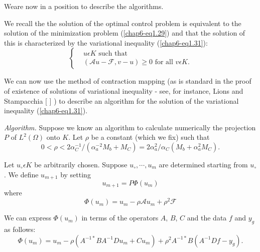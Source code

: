 We\pageoriginale are now in a position to describe the algorithms.

\medskip 
{} We recall the the solution
of the optimal control problem is equivalent to the solution of the
minimization problem (\ref{chap6-eq1.29}) and that the solution of
this is characterized by the variational inequality
(\ref{chap6-eq1.31}): 
\begin{equation*}
\begin{cases}
& u \epsilon K \text{ such that }\\
& (\mathscr{A} u - \mathscr{F}, v - u) \geq 0 \text{ for all } v \epsilon K.
\end{cases}
\end{equation*}

We can now use the method of contraction mapping (as is standard in
the proof of existence of solutions of variational inequality - see,
for instance, Lions and Stampacchia [ ] ) to describe an algorithm for
the solution of the variational inequality (\ref{chap6-eq1.31}). 

{\em Algorithm.} Suppose we know an algorithm to calculate numerically
the projection $P$ of $L^{2} (\Omega)$ onto $K$. Let $\rho$ be a constant
(which we fix) such that 
\begin{equation*}
0 < \rho < 2\alpha_{C}^{-1} / (\alpha_{a}^{-2} M_{b} + M_{C}) = 2\alpha_{a}^{2} / \alpha_{C} (M_{b} + \alpha_{a}^{2} M_{C}).\tag{1.38}\label{chap6-eq1.38}
\end{equation*}

Let $u_{\circ} \epsilon K$ be arbitrarily chosen. Suppose $u_{\circ},
\cdots , u_{m}$ are determined starting from $u_{\circ}$. We define
$u_{m+1}$ by setting 
\begin{equation*}
u_{m+1} = P \Phi (u_{m})\tag{1.39}\label{chap6-eq1.39}
\end{equation*}
where
\begin{equation*}
\Phi (u_{m}) = u_{m} - \rho \mathscr{A}u_{m} + \rho^{2}
\mathscr{F}\tag*{$(1.39)'$}\label{chap6-eq1.39'} 
\end{equation*}

We can express $\Phi (u_{m})$ in terms of the operators $A$, $B$, $C$ and
the data $f$ and $y_{g}$ as follows: 
\begin{equation*}
\Phi (u_{m}) = u_{m} - \rho(A^{-1*} BA^{-1} Du_{m} + Cu_{m}) +
\rho^{2} A^{-1*} B(A^{-1} Df - y_{g}).\tag{1.40}\label{chap6-eq1.40} 
\end{equation*}

